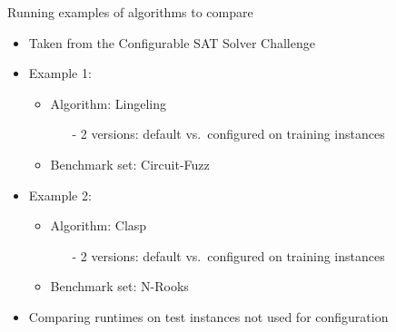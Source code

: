 \begin{frame}[c]{Running examples of algorithms to compare}

\begin{itemize}
  \item Taken from the \alert{Configurable SAT Solver Challenge}
  \medskip
  \pause
  \item Example 1:
  \begin{itemize}
	  \item Algorithm: Lingeling 
	  \begin{itemize}
	    \item[-] 2 versions: default vs.\ configured on training instances
	  \end{itemize}  
	  \pause
	  \item Benchmark set: Circuit-Fuzz 
  \end{itemize}
  \bigskip
  \pause
  \item Example 2:
  \begin{itemize}
	  \item Algorithm: Clasp 
	  \begin{itemize}
	    \item[-] 2 versions: default vs.\ configured on training instances
	  \end{itemize}  
	  \item Benchmark set: N-Rooks 
  \end{itemize}
  
\pause
\medskip
  \item Comparing runtimes on \alert{test instances not used for configuration}
\end{itemize}

\end{frame}


